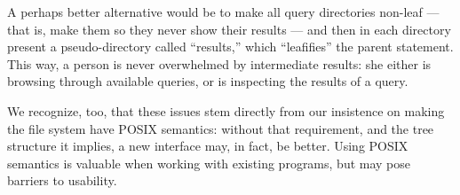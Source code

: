 \documentclass{article}
\begin{document}
A perhaps better alternative would be to make all query directories
non-leaf --- that is, make them so they never show their results ---
and then in each directory present a pseudo-directory called
``results,'' which ``leafifies'' the parent statement. This way, a
person is never overwhelmed by intermediate results: she either is
browsing through available queries, or is inspecting the results of a
query.

We recognize, too, that these issues stem directly from our insistence
on making the file system have POSIX semantics: without that
requirement, and the tree structure it implies, a new interface may,
in fact, be better. Using POSIX semantics is valuable when working
with existing programs, but may pose barriers to usability.



\vfill
\begin{center}
\end{center}
\vfill
\end{document}

